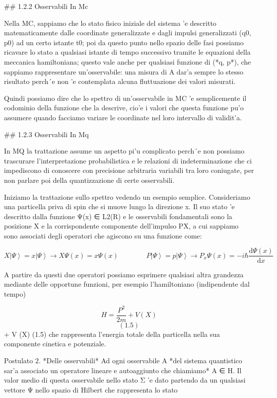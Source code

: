 ## 1.2.2 Osservabili In Mc

Nella MC, sappiamo che lo stato fisico iniziale del sistema 'e descritto matematicamente dalle coordinate generalizzate e dagli impulsi generalizzati (q0, p0) ad un certo istante t0; poi da questo punto nello spazio delle fasi possiamo ricavare lo stato a qualsiasi istante di tempo successivo tramite le equazioni della meccanica hamiltoniana; questo vale anche per qualsiasi funzione di (*q, p*), che sappiamo rappresentare un'osservabile: una misura di A dar'a sempre lo stesso risultato perch´e non 'e contemplata alcuna fluttuazione dei valori misurati.

Quindi possiamo dire che lo spettro di un'osservabile in MC 'e semplicemente il codominio della funzione che la descrive, cio'e i valori che questa funzione pu'o assumere quando facciamo variare le coordinate nel loro intervallo di validit'a.

## 1.2.3 Osservabili In Mq

In MQ la trattazione assume un aspetto pi'u complicato perch´e non possiamo trascurare l'interpretazione probabilistica e le relazioni di indeterminazione che ci impediscono di conoscere con precisione arbitraria variabili tra loro coniugate, per non parlare poi della quantizzazione di certe osservabili.

Iniziamo la trattazione sullo spettro vedendo un esempio semplice. Consideriamo una particella priva di spin che si muove lungo la direzione x. Il suo stato 'e descritto dalla funzione Ψ(x) ∈ L2(R) e le osservabili fondamentali sono la posizione X e la corrispondente componente dell'impulso PX, a cui sappiamo sono associati degli operatori che agiscono su una funzione come:

$$X\left|\Psi\right\rangle=x\left|\Psi\right\rangle\longrightarrow X\Psi(x)=x\Psi(x)\qquad\qquad P\left|\Psi\right\rangle=p\left|\Psi\right\rangle\longrightarrow P_{x}\Psi(x)=-i\hbar\frac{\mathrm{d}\Psi(x)}{\mathrm{d}x}\tag{1.4}$$

A partire da questi due operatori possiamo esprimere qualsiasi altra grandezza mediante delle opportune funzioni, per esempio l'hamiltoniano (indipendente dal tempo)

$$H={\frac{P^{2}}{2m}}+V(X)$$
$$(1.5)$$
+ V (X) (1.5)
che rappresenta l'energia totale della particella nella sua componente cinetica e potenziale.

Postulato 2. *Delle osservabili* Ad ogni osservabile A *del sistema quantistico sar'a associato un operatore lineare e autoaggiunto che chiamiamo* A ∈ H. Il valor medio di questa osservabile nello stato Σ 'e dato partendo da un qualsiasi vettore Ψ nello spazio di Hilbert che rappresenta lo stato

